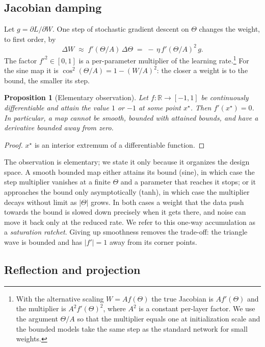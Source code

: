 \documentclass[11pt,a4paper]{article}
\newtheorem{proposition}{Proposition}
\begin{document}
\subsection{Jacobian damping}

Let $g=\partial L/\partial W$. One step of stochastic gradient descent on $\Theta$ changes the weight, to first
order, by
\begin{equation}
  \Delta W \;\approx\; f'(\Theta/A)\,\Delta\Theta \;=\; -\,\eta\, f'(\Theta/A)^2\, g . \label{eq:damping}
\end{equation}
The factor $f'^2\in[0,1]$ is a per-parameter multiplier of the learning rate.\footnote{With the alternative
scaling $W=A f(\Theta)$ the true Jacobian is $A f'(\Theta)$ and the multiplier is $A^2 f'(\Theta)^2$, where
$A^2$ is a constant per-layer factor. We use the argument $\Theta/A$ so that the multiplier equals one at
initialization scale and the bounded models take the same step as the standard network for small weights.} For the sine map
it is $\cos^2(\Theta/A)=1-(W/A)^2$: the closer a weight is to the bound, the smaller its step.

\begin{proposition}[Elementary observation]\label{prop:tradeoff}
Let $f:\mathbb{R}\to[-1,1]$ be continuously differentiable and attain the value $1$ or $-1$ at some point $x^\star$.
Then $f'(x^\star)=0$. In particular, a map cannot be smooth, bounded with attained bounds, and have a
derivative bounded away from zero.
\end{proposition}
\begin{proof}
$x^\star$ is an interior extremum of a differentiable function.
\end{proof}

The observation is elementary; we state it only because it organizes the design space. A smooth bounded map either attains its
bound (sine), in which case the step multiplier vanishes at a finite $\Theta$ and a parameter that reaches it
stops; or it approaches the bound only asymptotically (tanh), in which case the multiplier decays without
limit as $|\Theta|$ grows. In both cases a weight that the data push towards the bound is slowed down
precisely when it gets there, and noise can move it back only at the reduced rate. We refer to this
one-way accumulation as a \emph{saturation ratchet}. Giving up smoothness removes the trade-off: the triangle
wave is bounded and has $|f'|=1$ away from its corner points.

\subsection{Reflection and projection}
\end{document}
